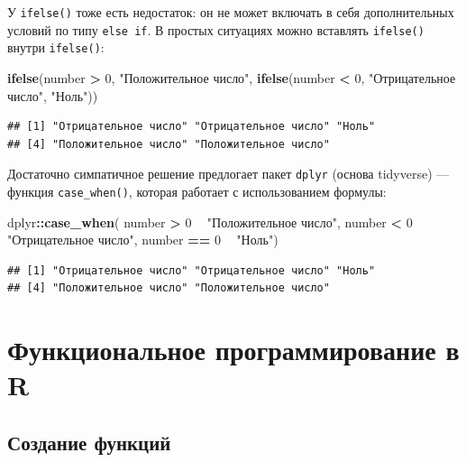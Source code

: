 \documentclass[]{book}
\newenvironment{Shaded}{\begin{snugshade}}{\end{snugshade}}
\newcommand{\KeywordTok}[1]{\textcolor[rgb]{0.13,0.29,0.53}{\textbf{#1}}}
\newcommand{\DecValTok}[1]{\textcolor[rgb]{0.00,0.00,0.81}{#1}}
\newcommand{\StringTok}[1]{\textcolor[rgb]{0.31,0.60,0.02}{#1}}
\newcommand{\OperatorTok}[1]{\textcolor[rgb]{0.81,0.36,0.00}{\textbf{#1}}}
\newcommand{\NormalTok}[1]{#1}
\begin{document}
У \texttt{ifelse()} тоже есть недостаток: он не может включать в себя
дополнительных условий по типу \texttt{else\ if}. В простых ситуациях
можно вставлять \texttt{ifelse()} внутри \texttt{ifelse()}:

\begin{Shaded}
\begin{Highlighting}[]
\KeywordTok{ifelse}\NormalTok{(number }\OperatorTok{>}\StringTok{ }\DecValTok{0}\NormalTok{,}
       \StringTok{"Положительное число"}\NormalTok{,}
       \KeywordTok{ifelse}\NormalTok{(number }\OperatorTok{<}\StringTok{ }\DecValTok{0}\NormalTok{, }\StringTok{"Отрицательное число"}\NormalTok{, }\StringTok{"Ноль"}\NormalTok{))}
\end{Highlighting}
\end{Shaded}

\begin{verbatim}
## [1] "Отрицательное число" "Отрицательное число" "Ноль"               
## [4] "Положительное число" "Положительное число"
\end{verbatim}

Достаточно симпатичное решение предлогает пакет \texttt{dplyr} (основа
tidyverse) --- функция \texttt{case\_when()}, которая работает с
использованием формулы:

\begin{Shaded}
\begin{Highlighting}[]
\NormalTok{dplyr}\OperatorTok{::}\KeywordTok{case_when}\NormalTok{(}
\NormalTok{  number }\OperatorTok{>}\StringTok{ }\DecValTok{0} \OperatorTok{~}\StringTok{ "Положительное число"}\NormalTok{,}
\NormalTok{  number }\OperatorTok{<}\StringTok{ }\DecValTok{0} \OperatorTok{~}\StringTok{ "Отрицательное число"}\NormalTok{,}
\NormalTok{  number }\OperatorTok{==}\StringTok{ }\DecValTok{0} \OperatorTok{~}\StringTok{ "Ноль"}\NormalTok{)}
\end{Highlighting}
\end{Shaded}

\begin{verbatim}
## [1] "Отрицательное число" "Отрицательное число" "Ноль"               
## [4] "Положительное число" "Положительное число"
\end{verbatim}

\chapter{Функциональное программирование в R}\label{functional}

\section{Создание функций}\label{create_fun}
\end{document}
